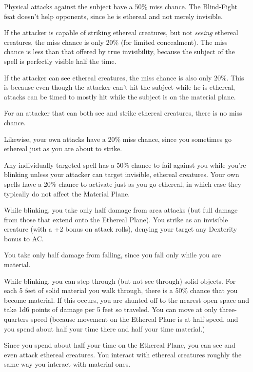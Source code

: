 \begin{list}{}{\leftmargin=1em}
 \item Physical attacks against the subject have a 50\% miss chance. 
 The Blind-Fight feat doesn't help opponents, since he is ethereal and not merely invisible.
 \item If the attacker is capable of striking ethereal creatures, but not \emph{seeing}
 ethereal creatures, the miss chance is only 20\% (for limited concealment).
 The miss chance is less than that offered by true invisibility, because the subject of the spell
 is perfectly visible half the time.
 \item If the attacker can see ethereal creatures, the miss chance is also only 20\%.
 This is because even though the attacker can't hit the subject while he is ethereal, 
 attacks can be timed to mostly hit while the subject is on the material plane.
 \item For an attacker that can both see and strike ethereal creatures, there is no miss chance.
\end{list}  
Likewise, your own attacks have a 20\% miss chance, 
since you sometimes go ethereal just as you are about to strike.

Any individually targeted spell has a 50\% chance to fail against you while you're blinking unless 
your attacker can target invisible, ethereal creatures. 
Your own spells have a 20\% chance to activate just as you go ethereal, 
in which case they typically do not affect the Material Plane.

While blinking, you take only half damage from area attacks 
(but full damage from those that extend onto the Ethereal Plane). 
You strike as an invisible creature (with a +2 bonus on attack rolls), 
denying your target any Dexterity bonus to AC.

You take only half damage from falling, since you fall only while you are material.

While blinking, you can step through (but not see through) solid objects. 
For each 5 feet of solid material you walk through, 
there is a 50\% chance that you become material. 
If this occurs, you are shunted off to the nearest open space and take 1d6 points of damage per 5 feet so traveled. 
You can move at only three-quarters speed 
(because movement on the Ethereal Plane is at half speed, 
and you spend about half your time there and half your time material.)

Since you spend about half your time on the Ethereal Plane, 
you can see and even attack ethereal creatures. 
You interact with ethereal creatures roughly the same way you interact with material ones.

